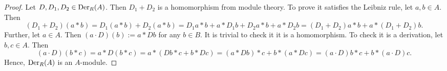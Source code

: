 \begin{proof}
  Let $D, D_1, D_2 \in {\rm Der}_R(A)$.
  Then $D_1 + D_2$ is a homomorphism from module theory.
  To prove it satisfies the Leibniz rule, let $a, b \in A$.
  Then
  \begin{equation}
    (D_1 + D_2)(a * b)
    = D_1(a * b) + D_2(a * b)
    = D_1 a * b + a * D_1 b + D_2 a * b + a * D_2 b
    = (D_1 + D_2) a * b + a * (D_1 + D_2) b.
  \end{equation}
  Further, let $a \in A$.
  Then $(a \cdot D)(b) := a * D b$ for any $b \in B$.
  It is trivial to check it it is a homomorphism.
  To check it is a derivation, let $b, c \in A$.
  Then
  \begin{equation}
    (a \cdot D)(b * c)
    = a * D(b * c)
    = a * (D b * c + b * D c)
    = (a * D b) * c + b * (a * D c)
    = (a \cdot D) b * c + b * (a \cdot D) c. 
  \end{equation}
  Hence, ${\rm Der}_R(A)$ is an $A$-module.
\end{proof}
